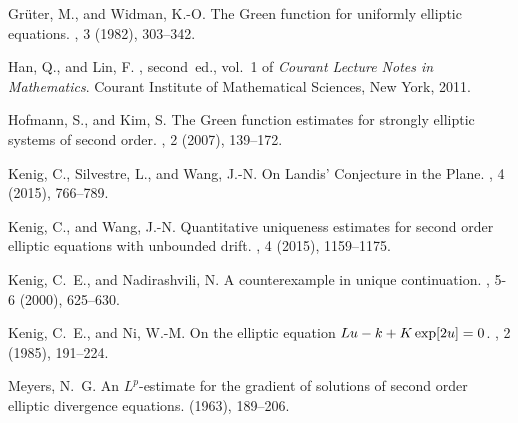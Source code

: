 \documentclass[12pt,reqno]{amsart}
\theoremstyle{plain}
\theoremstyle{definition}
\begin{document}
\begin{thebibliography}{10}
{\sc Gr{\"u}ter, M., and Widman, K.-O.}
\newblock The {G}reen function for uniformly elliptic equations.
, 3 (1982), 303--342.

{\sc Han, Q., and Lin, F.}
, second~ed., vol.~1 of
  {\em Courant Lecture Notes in Mathematics}.
\newblock Courant Institute of Mathematical Sciences, New York, 2011.

{\sc Hofmann, S., and Kim, S.}
\newblock The {G}reen function estimates for strongly elliptic systems of
  second order.
, 2 (2007), 139--172.

{\sc Kenig, C., Silvestre, L., and Wang, J.-N.}
\newblock On {L}andis' {C}onjecture in the {P}lane.
, 4 (2015), 766--789.

{\sc Kenig, C., and Wang, J.-N.}
\newblock Quantitative uniqueness estimates for second order elliptic equations
  with unbounded drift.
, 4 (2015), 1159--1175.

{\sc Kenig, C.~E., and Nadirashvili, N.}
\newblock A counterexample in unique continuation.
, 5-6 (2000), 625--630.

{\sc Kenig, C.~E., and Ni, W.-M.}
\newblock On the elliptic equation {$Lu-k+K\,{\rm exp}[2u]=0$}.
, 2 (1985),
  191--224.

{\sc Meyers, N.~G.}
\newblock An {$L^{p}$}-estimate for the gradient of solutions of second order
  elliptic divergence equations.
 (1963), 189--206.

\end{thebibliography}

%
%
%
\end{document}
